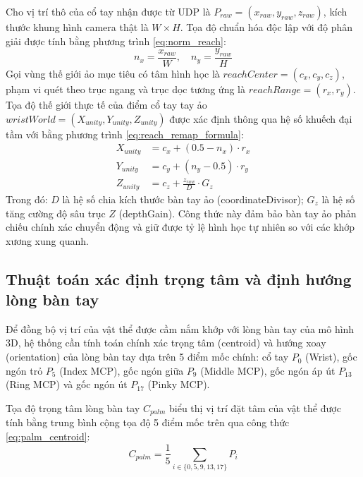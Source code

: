 \documentclass[../BTL.tex]{subfiles}
\begin{document}
Cho vị trí thô của cổ tay nhận được từ UDP là $P_{raw} = (x_{raw}, y_{raw}, z_{raw})$, kích thước khung hình camera thật là $W \times H$. Tọa độ chuẩn hóa độc lập với độ phân giải được tính bằng phương trình \eqref{eq:norm_reach}:
\begin{equation}
\label{eq:norm_reach}
n_x = \frac{x_{raw}}{W}, \quad n_y = \frac{y_{raw}}{H}
\end{equation}
Gọi vùng thế giới ảo mục tiêu có tâm hình học là $reachCenter = (c_x, c_y, c_z)$, phạm vi quét theo trục ngang và trục dọc tương ứng là $reachRange = (r_x, r_y)$. Tọa độ thế giới thực tế của điểm cổ tay tay ảo $wristWorld = (X_{unity}, Y_{unity}, Z_{unity})$ được xác định thông qua hệ số khuếch đại tầm với bằng phương trình \eqref{eq:reach_remap_formula}:
\begin{equation}
\label{eq:reach_remap_formula}
\begin{aligned}
X_{unity} &= c_x + (0.5 - n_x) \cdot r_x \\
Y_{unity} &= c_y + (n_y - 0.5) \cdot r_y \\
Z_{unity} &= c_z + \frac{z_{raw}}{D} \cdot G_z
\end{aligned}
\end{equation}
Trong đó: $D$ là hệ số chia kích thước bàn tay ảo (coordinateDivisor); $G_z$ là hệ số tăng cường độ sâu trục $Z$ (depthGain). Công thức này đảm bảo bàn tay ảo phản chiếu chính xác chuyển động và giữ được tỷ lệ hình học tự nhiên so với các khớp xương xung quanh.

\subsection{Thuật toán xác định trọng tâm và định hướng lòng bàn tay}
Để đồng bộ vị trí của vật thể được cầm nắm khớp với lòng bàn tay của mô hình 3D, hệ thống cần tính toán chính xác trọng tâm (centroid) và hướng xoay (orientation) của lòng bàn tay dựa trên 5 điểm mốc chính: cổ tay $P_0$ (Wrist), gốc ngón trỏ $P_5$ (Index MCP), gốc ngón giữa $P_9$ (Middle MCP), gốc ngón áp út $P_{13}$ (Ring MCP) và gốc ngón út $P_{17}$ (Pinky MCP).

Tọa độ trọng tâm lòng bàn tay $C_{palm}$ biểu thị vị trí đặt tâm của vật thể được tính bằng trung bình cộng tọa độ 5 điểm mốc trên qua công thức \eqref{eq:palm_centroid}:
\begin{equation}
\label{eq:palm_centroid}
C_{palm} = \frac{1}{5} \sum_{i \in \{0, 5, 9, 13, 17\}} P_i
\end{equation}
\end{document}
